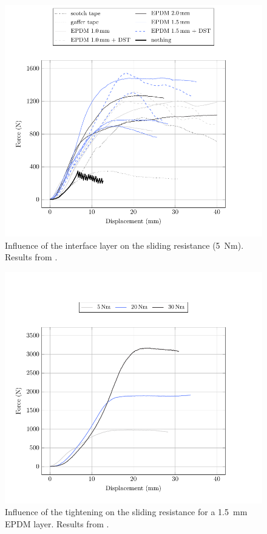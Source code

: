 \begin{figure}[p]
\centering
\begin{fullpage}
	\includegraphics[]{ch2a_creteil/plot/1_layer_benchmark/build.pdf}
	\caption[Influence of the interface layer on the sliding resistance]{Influence of the interface layer on the sliding resistance (\SI{5}{Nm}). Results from \cite{Tayeb2015a}.}
	\label{plot:layer_benchmark}
\end{fullpage}
\end{figure}

\begin{figure}[p]
\centering
\begin{fullpage}
	\includegraphics[]{ch2a_creteil/plot/3_tightening/build.pdf}
	\caption[Influence of the tightening on the sliding resistance]{Influence of the tightening on the sliding resistance for a \SI{1.5}{\mm} EPDM layer. Results from \cite{Tayeb2015a}.}
	\label{plot:tightening}
\end{fullpage}
\end{figure}

